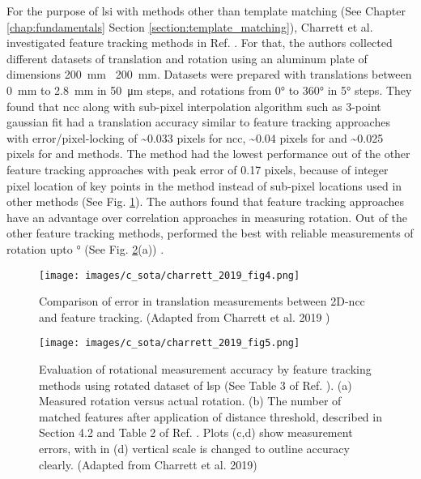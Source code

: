 For the purpose of \gls{lsi} with methods other than template matching (See Chapter \ref{chap:fundamentals} Section \ref{section:template_matching}), Charrett et al. investigated feature tracking methods in Ref. \cite{charrett_2019}. For that, the authors collected different datasets of translation and rotation using an aluminum plate of dimensions \SI{200}{\milli\meter} \times\ \SI{200}{\milli\meter}. Datasets were prepared with translations between \SI{0}{\milli\meter} to \SI{2.8}{\milli\meter} in \SI{50}{\micro\meter} steps, and rotations from 0° to 360° in 5° steps. They found that \gls{ncc} along with sub-pixel interpolation algorithm such as 3-point gaussian fit \cite{raffel} had a translation accuracy similar to feature tracking approaches with error/pixel-locking of \sim0.033 pixels for \gls{ncc}, \sim0.04 pixels for \cite{brisk_feature} and \sim0.025 pixels for \cite{surf_feature} and \cite{surf_feature} methods. The \cite{orb_feature} method had the lowest performance out of the other feature tracking approaches with peak error of 0.17 pixels, because of integer pixel location of key points in the method instead of sub-pixel locations used in other methods (See Fig. \ref{fig:charrett_2019_fig4}). The authors found that feature tracking approaches have an advantage over correlation approaches in measuring rotation. Out of the other feature tracking methods,  performed the best with reliable measurements of rotation upto ° (See Fig. \ref{fig:charrett_2019_fig5}(a)) \cite{charrett_2019}.


\begin{figure}[h]
    \centering
    \texttt{[image: images/c\_sota/charrett\_2019\_fig4.png]}
    \caption{Comparison of error in translation measurements between 2D-\gls{ncc} and feature tracking. (Adapted from Charrett et al. 2019 \cite{charrett_2019})}
    \label{fig:charrett_2019_fig4}
\end{figure} 

\begin{figure}[h]
    \centering
    \texttt{[image: images/c\_sota/charrett\_2019\_fig5.png]}
    \caption{Evaluation of rotational measurement accuracy by feature tracking methods using rotated dataset of \gls{lsp} (See Table 3 of Ref. \cite{charrett_2019}). (a) Measured rotation versus actual rotation. (b) The number of matched features after application of distance threshold, described in Section 4.2 and Table 2 of Ref. \cite{charrett_2019}. Plots (c,d) show measurement errors, with in (d) vertical scale is changed to outline accuracy clearly. (Adapted from Charrett et al. 2019\cite{charrett_2019})}
    \label{fig:charrett_2019_fig5}
\end{figure} 

